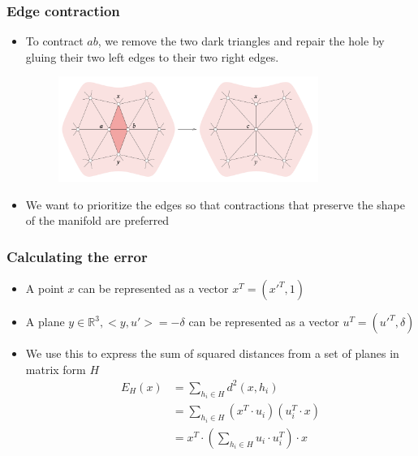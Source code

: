 \documentclass{beamer}
\begin{document}
\begin{frame}[t]
    \frametitle{Edge contraction}
    \begin{itemize}
        \item To contract $ab$, we remove the two dark triangles and repair the hole
        by gluing their two left edges to their two right edges.
        \begin{figure}[h]
            \begin{center}
            \includegraphics[width=0.8\textwidth]{edge_contract.png}
            \end{center}
        \end{figure}
        \item We want to prioritize the edges so that contractions that preserve
        the shape of the manifold are preferred
    \end{itemize}
\end{frame}
\begin{frame}[t]
    \frametitle{Calculating the error}
    \begin{itemize}
        \item A point $x$ can be represented as a vector $x^T = (x'^T, 1)$  
        \item A plane $y \in \mathbb{R}^3, <y, u'> = -\delta$ can be represented
        as a vector $u^T = (u'^T, \delta)$
        \item We use this to express the sum of squared distances
        from a set of planes in matrix form $H$
        \begin{align*}
            E_H(x) &= \sum_{h_i \in H} d^2(x, h_i)\\
                   &=\sum_{h_i \in H} (x^T \cdot u_i) (u_i^T \cdot x)\\
                   &= x^T \cdot \left( \sum_{h_i \in H} u_i \cdot u_i^T \right) \cdot x
        \end{align*}
    \end{itemize}
\end{frame}
\end{document}
